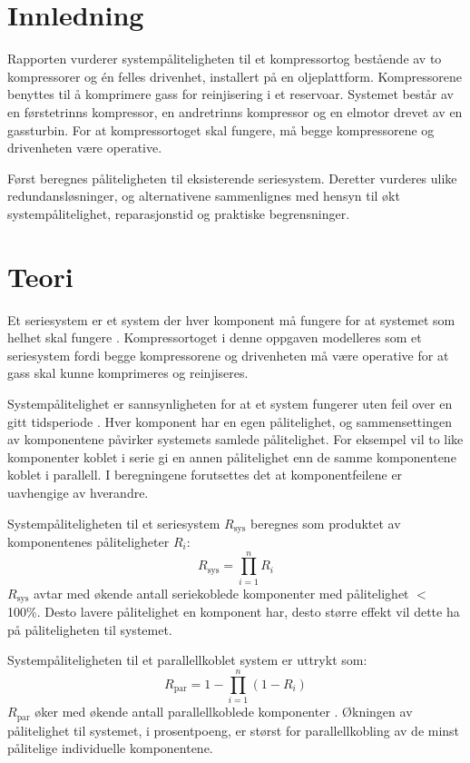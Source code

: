 \newpage
\section{Innledning}
Rapporten vurderer systempåliteligheten til et kompressortog bestående av to kompressorer og én felles drivenhet, installert på en oljeplattform. Kompressorene benyttes til å komprimere gass for reinjisering i et reservoar. Systemet består av en førstetrinns kompressor, en andretrinns kompressor og en elmotor drevet av en gassturbin. For at kompressortoget skal fungere, må begge kompressorene og drivenheten være operative.

Først beregnes påliteligheten til eksisterende seriesystem. Deretter vurderes ulike redundansløsninger, og alternativene sammenlignes med hensyn til økt systempålitelighet, reparasjonstid og praktiske begrensninger.

\section{Teori}

Et seriesystem er et system der hver komponent må fungere for at systemet som helhet skal fungere \parencite{pedersen_syspal}. Kompressortoget i denne oppgaven modelleres som et seriesystem fordi begge kompressorene og drivenheten må være operative for at gass skal kunne komprimeres og reinjiseres.

Systempålitelighet er sannsynligheten for at et system fungerer uten feil over en gitt tidsperiode \parencite{pedersen_syspal}. Hver komponent har en egen pålitelighet, og sammensettingen av komponentene påvirker systemets samlede pålitelighet. For eksempel vil to like komponenter koblet i serie gi en annen pålitelighet enn de samme komponentene koblet i parallell. I beregningene forutsettes det at komponentfeilene er uavhengige av hverandre.

Systempåliteligheten til et seriesystem $R_{\text{sys}}$ beregnes som produktet av komponentenes påliteligheter $R_i$:
\begin{equation}
R_{\text{sys}} = \prod_{i=1}^{n} R_i
\end{equation}
$R_{\text{sys}}$ avtar med økende antall seriekoblede komponenter med pålitelighet $<$ 100\%. Desto lavere pålitelighet en komponent har, desto større effekt vil dette ha på påliteligheten til systemet.

Systempåliteligheten til et parallellkoblet system er uttrykt som:
\begin{equation}
R_{\text{par}} = 1 - \prod_{i=1}^{n} (1 - R_i)
\end{equation}
$R_{\text{par}}$ øker med økende antall parallellkoblede komponenter \parencite{pedersen_syspal}. Økningen av pålitelighet til systemet, i prosentpoeng, er størst for parallellkobling av de minst pålitelige individuelle komponentene.

